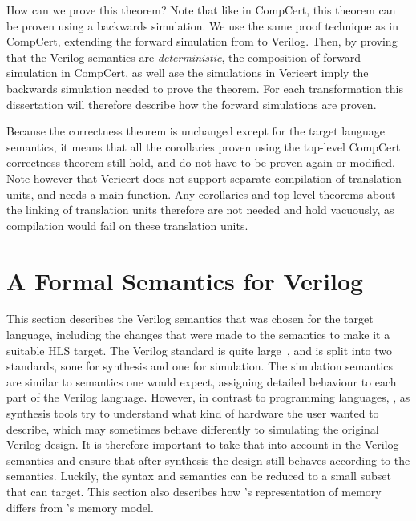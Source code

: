 How can we prove this theorem?  Note that like in CompCert, this theorem can be
proven using a backwards simulation.  We use the same proof technique as in
CompCert, extending the forward simulation from \rtl{} to Verilog.  Then, by
proving that the Verilog semantics are \emph{deterministic}, the composition of
forward simulation in CompCert, as well ase the simulations in Vericert imply
the backwards simulation needed to prove the theorem.  For each transformation
this dissertation will therefore describe how the forward simulations are
proven.

Because the correctness theorem is unchanged except for the target language
semantics, it means that all the corollaries proven using the top-level CompCert
correctness theorem still hold, and do not have to be proven again or modified.
Note however that Vericert does not support separate compilation of translation
units, and needs a main function.  Any corollaries and top-level theorems about
the linking of translation units therefore are not needed and hold vacuously, as
compilation would fail on these translation units.

\section{A Formal Semantics for Verilog}\label{sec:verilog}

This section describes the Verilog semantics that was chosen for the target
language, including the changes that were made to the semantics to make it a
suitable HLS target.  The Verilog standard is quite
large~\cite{06_ieee_stand_veril_hardw_descr_languag,05_ieee_stand_veril_regis_trans_level_synth},
and is split into two standards, sone for synthesis and one for simulation.  The
simulation semantics are similar to semantics one would expect, assigning
detailed behaviour to each part of the Verilog language.  However, in contrast
to programming languages, , as
synthesis tools try to understand what kind of hardware the user wanted to
describe, which may sometimes behave differently to simulating the original
Verilog design.  It is therefore important to take that into account in the
Verilog semantics and ensure that after synthesis the design still behaves
according to the semantics.  Luckily, the syntax and semantics can be reduced to
a small subset that \vericert{} can target.  This section also describes how
\vericert{}'s representation of memory differs from \compcert{}'s memory model.

